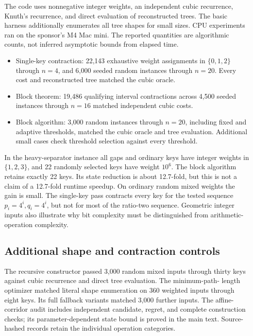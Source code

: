 \documentclass[11pt]{article}
\begin{document}
The code uses nonnegative integer weights, an independent cubic recurrence,
Knuth's recurrence, and direct evaluation of reconstructed trees.
The basic harness additionally enumerates all tree shapes for small sizes.
CPU experiments ran on the sponsor's M4 Mac mini. The reported quantities
are algorithmic counts, not inferred asymptotic bounds from elapsed time.

\begin{itemize}
\item Single-key contraction: 22,143 exhaustive weight assignments in
$\{0,1,2\}$ through $n=4$, and 6,000 seeded random instances through $n=20$.
Every cost and reconstructed tree matched the cubic oracle.
\item Block theorem: 19,486 qualifying interval contractions across 4,500
seeded instances through $n=16$ matched independent cubic costs.
\item Block algorithm: 3,000 random instances through $n=20$, including
fixed and adaptive thresholds, matched the cubic oracle and tree evaluation.
Additional small cases check threshold selection against every threshold.
\end{itemize}

\label{tab:states}

In the heavy-separator instance all gaps and ordinary keys have integer
weights in $\{1,2,3\}$, and 22 randomly selected keys have weight $10^6$.
The block algorithm retains exactly 22 keys. Its state reduction is about
12.7-fold, but this is not a claim of a 12.7-fold runtime speedup.
On ordinary random mixed weights the gain is small.
The single-key pass contracts every key for the tested sequence
$p_i=4^i,q_i=4^i$, but not for most of the ratio-two sequence.
Geometric integer inputs also illustrate why bit complexity must be
distinguished from arithmetic-operation complexity.


\subsection{Additional shape and contraction controls}
The recursive constructor passed 3,000 random mixed inputs through thirty
keys against cubic recurrence and direct tree evaluation. The minimum-path-
length optimizer matched literal shape enumeration on 360 weighted inputs
through eight keys. Its full fallback variants matched 3,000 further inputs.
The affine-corridor audit includes independent candidate, regret, and complete
construction checks; its parameter-dependent state bound is proved in the main
text. Source-hashed records retain the individual operation categories.
\end{document}
